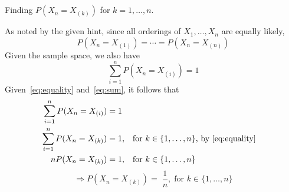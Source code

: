 \documentclass[hwnumber=3,studentnumber=20053722]{mthe353answer}
\begin{document}
  \begin{questions}
    \setcounter{question}{0}
    \question{}\noindent
    \begin{parts}
      \part{}\label{part:a}
      Finding \(P(X_n = X_{(k)})\) for \(k = 1, \dots, n\).
      \begin{solution}
        As noted by the given hint, since all orderings of \(X_1, \dots, X_n\)
        are equally likely,
        \begin{equation}\label{eq:equality}
          P(X_n = X_{(1)}) = \cdots = P(X_n = X_{(n)})
        \end{equation}
        Given the sample space, we also have
        \begin{equation}\label{eq:sum}
          \sum_{i=1}^n P(X_n = X_{(i)}) = 1
        \end{equation}
        Given~\eqref{eq:equality} and~\eqref{eq:sum}, it follows that
        \begin{align*}
          \sum_{i=1}^n P(X_n = X_{(i)}) =&\; 1\\
          \sum_{i=1}^n P(X_n = X_{(k)}) =&\; 1, && \text{for } k \in \{1, \dots, n\} \text{, by~\eqref{eq:equality}}\\
          n P(X_n = X_{(k)}) =&\; 1, && \text{for } k \in \{1, \dots, n\}
        \end{align*}
        \begin{equation*}
          \Rightarrow \boxed{P(X_n = X_{(k)}) =\; \frac{1}{n},\; \text{for } k \in \{1, \dots, n\}}
        \end{equation*}
      \end{solution}

\end{parts}
\end{questions}
\end{document}

